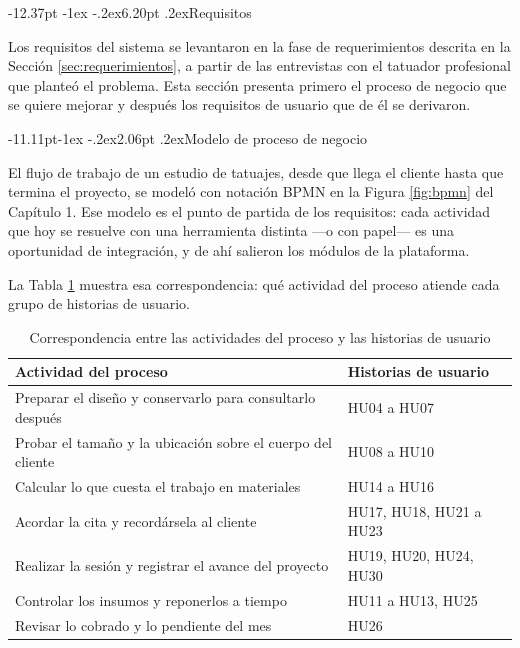 \documentclass[12pt,letterpaper,oneside]{report}
\makeatletter
\renewcommand\section{\@startsection{section}{1}{\z@}%
  {-12.37pt \@plus -1ex \@minus -.2ex}{6.20pt \@plus.2ex}{\normalfont\large\bfseries}}
\renewcommand\subsection{\@startsection{subsection}{2}{\z@}%
  {-11.11pt\@plus -1ex \@minus -.2ex}{2.06pt \@plus .2ex}{\normalfont\normalsize\bfseries}}
\makeatother
\begin{document}
\section{Requisitos}
\label{sec:requisitos}

Los requisitos del sistema se levantaron en la fase de requerimientos descrita en la Sección \ref{sec:requerimientos}, a partir de las entrevistas con el tatuador profesional que planteó el problema. Esta sección presenta primero el proceso de negocio que se quiere mejorar y después los requisitos de usuario que de él se derivaron.

\subsection{Modelo de proceso de negocio}

El flujo de trabajo de un estudio de tatuajes, desde que llega el cliente hasta que termina el proyecto, se modeló con notación BPMN en la Figura \ref{fig:bpmn} del Capítulo 1. Ese modelo es el punto de partida de los requisitos: cada actividad que hoy se resuelve con una herramienta distinta —o con papel— es una oportunidad de integración, y de ahí salieron los módulos de la plataforma.

La Tabla \ref{tab:procesohu} muestra esa correspondencia: qué actividad del proceso atiende cada grupo de historias de usuario.

\begin{table}[H]
  \centering
  \caption{Correspondencia entre las actividades del proceso y las historias de usuario}
  \label{tab:procesohu}
  \renewcommand{\arraystretch}{1.2}
  \begin{tabular}{|p{7.4cm}|p{4.6cm}|}
    \hline
    \textbf{Actividad del proceso} & \textbf{Historias de usuario} \\
    \hline
    Preparar el diseño y conservarlo para consultarlo después & HU04 a HU07 \\ \hline
    Probar el tamaño y la ubicación sobre el cuerpo del cliente & HU08 a HU10 \\ \hline
    Calcular lo que cuesta el trabajo en materiales & HU14 a HU16 \\ \hline
    Acordar la cita y recordársela al cliente & HU17, HU18, HU21 a HU23 \\ \hline
    Realizar la sesión y registrar el avance del proyecto & HU19, HU20, HU24, HU30 \\ \hline
    Controlar los insumos y reponerlos a tiempo & HU11 a HU13, HU25 \\ \hline
    Revisar lo cobrado y lo pendiente del mes & HU26 \\ \hline
  \end{tabular}
\end{table}
\end{document}
